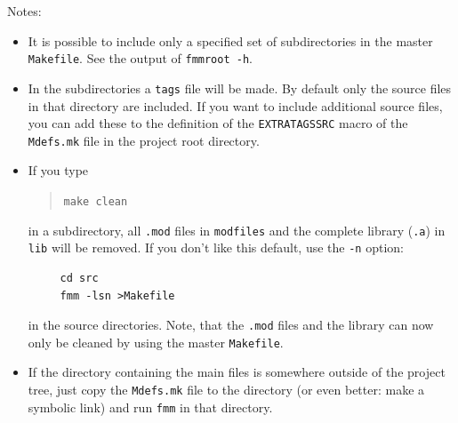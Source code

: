 Notes:
\begin{itemize}
   \item It is possible to include only a specified set of 
         subdirectories in the master \texttt{Makefile}. See the output of
         \texttt{fmmroot -h}.
   \item In the subdirectories a \texttt{tags} file will be made. By default
only the source files in that directory are included. If you want to include
additional source files, you can add these to the definition of
the \texttt{EXTRATAGSSRC} macro of the \texttt{Mdefs.mk} file in the project 
root directory.
   \item If you type
\begin{quote}
   \texttt{make clean}
\end{quote}
in a subdirectory, all \texttt{.mod} files in \texttt{modfiles} and the
complete library (\texttt{.a}) in \texttt{lib} will be removed. If you don't
like this default, use the \texttt{-n} option:
\begin{verbatim}
     cd src
     fmm -lsn >Makefile
\end{verbatim}
in the source directories. Note, that the \texttt{.mod} files and the library
can now only be cleaned by using the master \texttt{Makefile}.
   \item If the directory containing the main files is somewhere outside of the
         project tree, just copy the \texttt{Mdefs.mk} file to the directory
         (or even better: make a symbolic link) and run \texttt{fmm} in that
         directory.
\end{itemize}


